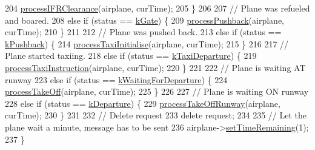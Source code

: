 \begin{DoxyCode}
204         \hyperlink{classATC_ac81f1cbc3ce6a9e85420059a19d99dc5}{processIFRClearance}(airplane, curTime);
205     \}
206 
207     \textcolor{comment}{// Plane was refueled and boared.}
208     \textcolor{keywordflow}{else} \textcolor{keywordflow}{if} (status == \hyperlink{Airplane_8h_a0e5bbf7c6c727baaba49062300fae19fa20dbec285a7773f72e48eccef8ae84da}{kGate}) \{
209         \hyperlink{classATC_a15754e64db38a7d1280d1ffd5b1db652}{processPushback}(airplane, curTime);
210     \}
211 
212     \textcolor{comment}{// Plane was pushed back.}
213     \textcolor{keywordflow}{else} \textcolor{keywordflow}{if} (status == \hyperlink{Airplane_8h_a0e5bbf7c6c727baaba49062300fae19fa117bb5da4739b13c4915f7d721f3d2a5}{kPushback}) \{
214         \hyperlink{classATC_a50cbfabf87d9ebc20ca89baea036d602}{processTaxiInitialise}(airplane, curTime);
215     \}
216 
217     \textcolor{comment}{// Plane started taxiing.}
218     \textcolor{keywordflow}{else} \textcolor{keywordflow}{if} (status == \hyperlink{Airplane_8h_a0e5bbf7c6c727baaba49062300fae19fa3a6a40398243a8892b8084a9e0107015}{kTaxiDeparture}) \{
219         \hyperlink{classATC_aa56d55e184aa49375693bccfc016a689}{processTaxiInstruction}(airplane, curTime);
220     \}
221 
222     \textcolor{comment}{// Plane is waiting AT runway}
223     \textcolor{keywordflow}{else} \textcolor{keywordflow}{if} (status == \hyperlink{Airplane_8h_a0e5bbf7c6c727baaba49062300fae19fa5fc2da75439f367169d2a71f865d6bde}{kWaitingForDeparture}) \{
224         \hyperlink{classATC_ac5a18f099244ebdc6edcca687d02c1cf}{processTakeOff}(airplane, curTime);
225     \}
226 
227     \textcolor{comment}{// Plane is waiting ON runway}
228     \textcolor{keywordflow}{else} \textcolor{keywordflow}{if} (status == \hyperlink{Airplane_8h_a0e5bbf7c6c727baaba49062300fae19fae2255e82c6ed427f0820a47f2e5f5ac9}{kDeparture}) \{
229         \hyperlink{classATC_a90ec9958b0a3b1d4395959afa14165c0}{processTakeOffRunway}(airplane, curTime);
230     \}
231 
232     \textcolor{comment}{// Delete request}
233     \textcolor{keyword}{delete} request;
234 
235     \textcolor{comment}{// Let the plane wait a minute, message has to be sent}
236     airplane->\hyperlink{classAirplane_a43e7b856df001168956ed6d115943ec9}{setTimeRemaining}(1);
237 \}
\end{DoxyCode}
